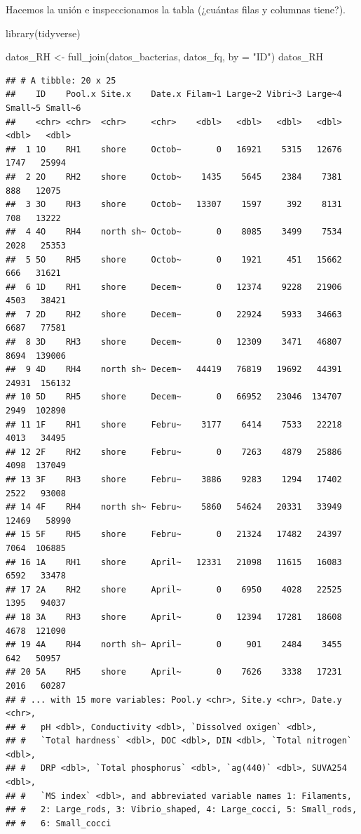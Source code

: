 \documentclass[
]{book}
\newenvironment{Shaded}{\begin{snugshade}}{\end{snugshade}}
\newcommand{\AttributeTok}[1]{\textcolor[rgb]{0.77,0.63,0.00}{#1}}
\newcommand{\FunctionTok}[1]{\textcolor[rgb]{0.00,0.00,0.00}{#1}}
\newcommand{\NormalTok}[1]{#1}
\newcommand{\OtherTok}[1]{\textcolor[rgb]{0.56,0.35,0.01}{#1}}
\newcommand{\StringTok}[1]{\textcolor[rgb]{0.31,0.60,0.02}{#1}}
\begin{document}
Hacemos la unión e inspeccionamos la tabla (¿cuántas filas y columnas tiene?).

\begin{Shaded}
\begin{Highlighting}[]
\FunctionTok{library}\NormalTok{(tidyverse)}
\end{Highlighting}
\end{Shaded}

\begin{Shaded}
\begin{Highlighting}[]
\NormalTok{datos\_RH }\OtherTok{\textless{}{-}} \FunctionTok{full\_join}\NormalTok{(datos\_bacterias, datos\_fq, }\AttributeTok{by =} \StringTok{"ID"}\NormalTok{)}
\NormalTok{datos\_RH }
\end{Highlighting}
\end{Shaded}

\begin{verbatim}
## # A tibble: 20 x 25
##    ID    Pool.x Site.x    Date.x Filam~1 Large~2 Vibri~3 Large~4 Small~5 Small~6
##    <chr> <chr>  <chr>     <chr>    <dbl>   <dbl>   <dbl>   <dbl>   <dbl>   <dbl>
##  1 1O    RH1    shore     Octob~       0   16921    5315   12676    1747   25994
##  2 2O    RH2    shore     Octob~    1435    5645    2384    7381     888   12075
##  3 3O    RH3    shore     Octob~   13307    1597     392    8131     708   13222
##  4 4O    RH4    north sh~ Octob~       0    8085    3499    7534    2028   25353
##  5 5O    RH5    shore     Octob~       0    1921     451   15662     666   31621
##  6 1D    RH1    shore     Decem~       0   12374    9228   21906    4503   38421
##  7 2D    RH2    shore     Decem~       0   22924    5933   34663    6687   77581
##  8 3D    RH3    shore     Decem~       0   12309    3471   46807    8694  139006
##  9 4D    RH4    north sh~ Decem~   44419   76819   19692   44391   24931  156132
## 10 5D    RH5    shore     Decem~       0   66952   23046  134707    2949  102890
## 11 1F    RH1    shore     Febru~    3177    6414    7533   22218    4013   34495
## 12 2F    RH2    shore     Febru~       0    7263    4879   25886    4098  137049
## 13 3F    RH3    shore     Febru~    3886    9283    1294   17402    2522   93008
## 14 4F    RH4    north sh~ Febru~    5860   54624   20331   33949   12469   58990
## 15 5F    RH5    shore     Febru~       0   21324   17482   24397    7064  106885
## 16 1A    RH1    shore     April~   12331   21098   11615   16083    6592   33478
## 17 2A    RH2    shore     April~       0    6950    4028   22525    1395   94037
## 18 3A    RH3    shore     April~       0   12394   17281   18608    4678  121090
## 19 4A    RH4    north sh~ April~       0     901    2484    3455     642   50957
## 20 5A    RH5    shore     April~       0    7626    3338   17231    2016   60287
## # ... with 15 more variables: Pool.y <chr>, Site.y <chr>, Date.y <chr>,
## #   pH <dbl>, Conductivity <dbl>, `Dissolved oxigen` <dbl>,
## #   `Total hardness` <dbl>, DOC <dbl>, DIN <dbl>, `Total nitrogen` <dbl>,
## #   DRP <dbl>, `Total phosphorus` <dbl>, `ag(440)` <dbl>, SUVA254 <dbl>,
## #   `MS index` <dbl>, and abbreviated variable names 1: Filaments,
## #   2: Large_rods, 3: Vibrio_shaped, 4: Large_cocci, 5: Small_rods,
## #   6: Small_cocci
\end{verbatim}
\end{document}
